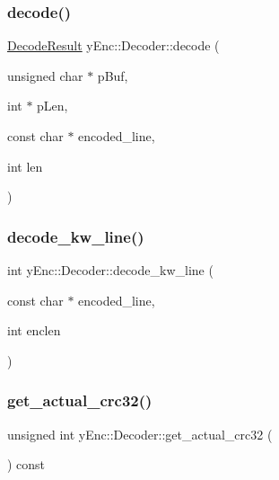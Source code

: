 \hypertarget{classy_enc_1_1_decoder_a56e981189a5b72543cde1dca74bb459b}{}\label{classy_enc_1_1_decoder_a56e981189a5b72543cde1dca74bb459b} 
\subsubsection{\texorpdfstring{decode()}{decode()}\hspace{0.1cm}{\footnotesize\ttfamily [2/2]}}
{\footnotesize\ttfamily \hyperlink{namespacey_enc_a6e002c8cbde1ad4f0f425b0b2b62c7ff}{Decode\+Result} y\+Enc\+::\+Decoder\+::decode (\begin{DoxyParamCaption}\item[{unsigned char $\ast$}]{p\+Buf,  }\item[{int $\ast$}]{p\+Len,  }\item[{const char $\ast$}]{encoded\+\_\+line,  }\item[{int}]{len }\end{DoxyParamCaption})}

\hypertarget{classy_enc_1_1_decoder_af1868fb8c1445bbe32751e839a1403b4}{}\label{classy_enc_1_1_decoder_af1868fb8c1445bbe32751e839a1403b4} 
\subsubsection{\texorpdfstring{decode\+\_\+kw\+\_\+line()}{decode\_kw\_line()}}
{\footnotesize\ttfamily int y\+Enc\+::\+Decoder\+::decode\+\_\+kw\+\_\+line (\begin{DoxyParamCaption}\item[{const char $\ast$}]{encoded\+\_\+line,  }\item[{int}]{enclen }\end{DoxyParamCaption})\hspace{0.3cm}{\ttfamily [protected]}}

\hypertarget{classy_enc_1_1_decoder_a4009ce9e9b4be8e2b18b44b2a329052e}{}\label{classy_enc_1_1_decoder_a4009ce9e9b4be8e2b18b44b2a329052e} 
\subsubsection{\texorpdfstring{get\+\_\+actual\+\_\+crc32()}{get\_actual\_crc32()}}
{\footnotesize\ttfamily unsigned int y\+Enc\+::\+Decoder\+::get\+\_\+actual\+\_\+crc32 (\begin{DoxyParamCaption}{ }\end{DoxyParamCaption}) const\hspace{0.3cm}{\ttfamily [inline]}}

